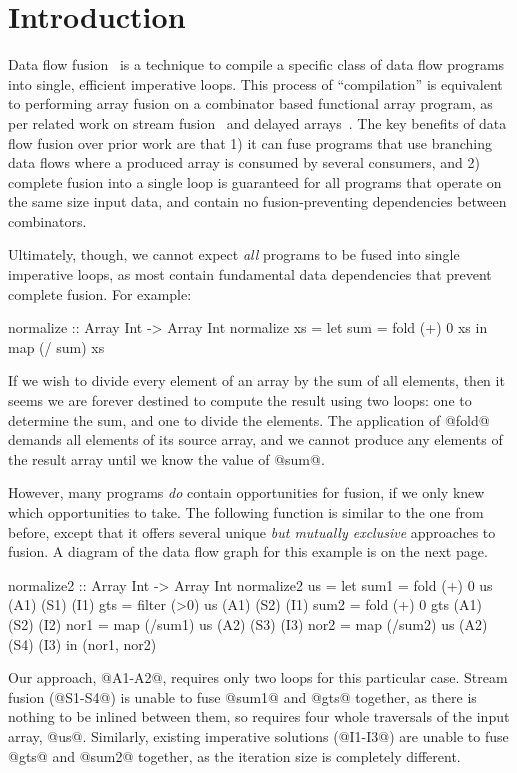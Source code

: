 \section{Introduction}

Data flow fusion~\cite{lippmeier2013flow} is a technique to compile a specific class of data flow programs into single, efficient imperative loops. This process of ``compilation'' is equivalent to performing array fusion on a combinator based functional array program, as per related work on stream fusion~\cite{coutts2007streamfusion} and delayed arrays~\cite{keller2010repa}.
The key benefits of data flow fusion over prior work are that 1) it can fuse programs that use branching data flows where a produced array is consumed by several consumers, and 2) complete fusion into a single loop is guaranteed for all programs that operate on the same size input data, and contain no fusion-preventing dependencies between combinators.


Ultimately, though, we cannot expect \emph{all} programs to be fused into single imperative loops, as most contain fundamental data dependencies that prevent complete fusion. For example:
\begin{code}
  normalize :: Array Int -> Array Int
  normalize xs = let sum = fold (+) 0 xs
                 in  map (/ sum) xs
\end{code}

If we wish to divide every element of an array by the sum of all elements, then it seems we are forever destined to compute the result using two loops: one to determine the sum, and one to divide the elements.
The application of @fold@ demands all elements of its source array, and we cannot produce any elements of the result array until we know the value of @sum@.

However, many programs \emph{do} contain opportunities for fusion, if we only knew which opportunities to take.
The following function is similar to the one from before, except that it offers several unique \emph{but mutually exclusive} approaches to fusion.
A diagram of the data flow graph for this example is on the next page.

\begin{code}
 normalize2 :: Array Int -> Array Int
 normalize2 us
  = let sum1 = fold   (+) 0 us      (A1) (S1) (I1)
        gts  = filter (>0)  us      (A1) (S2) (I1)
        sum2 = fold   (+) 0 gts     (A1) (S2) (I2)
        nor1 = map  (/sum1) us      (A2) (S3) (I3)
        nor2 = map  (/sum2) us      (A2) (S4) (I3)
    in (nor1, nor2)
\end{code}
Our approach, @A1-A2@, requires only two loops for this particular case.
Stream fusion (@S1-S4@) is unable to fuse @sum1@ and @gts@ together, as there is nothing to be inlined between them, so requires four whole traversals of the input array, @us@.
Similarly, existing imperative solutions (@I1-I3@) are unable to fuse @gts@ and @sum2@ together, as the iteration size is completely different.

